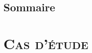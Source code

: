 \documentclass[xcolor=x11names, compress, 11pt]{beamer}
\begin{document}
\subsection{Sommaire}
\begin{frame}[t]
\tableofcontents[hideallsubsections]
\addtocounter{page}{-1}
\end{frame}


















\section{\scshape Cas d’étude}



\end{document}
